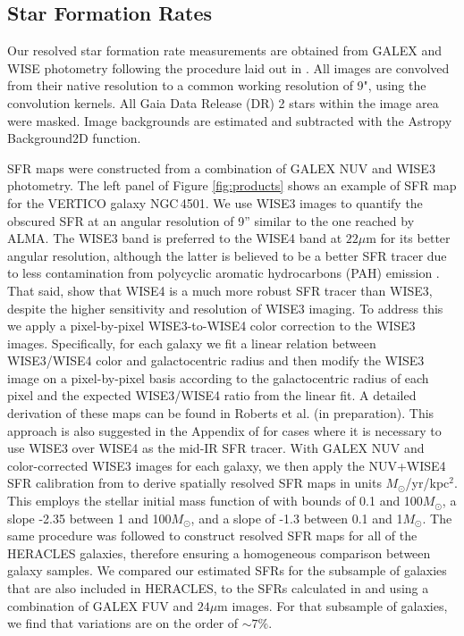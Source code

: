 \documentclass[longauth]{aa}
\begin{document}
\subsection{Star Formation Rates}
Our resolved star formation rate measurements are obtained from GALEX and WISE photometry following the procedure laid out in \citet{Leroy2019}. All images are convolved from their native resolution to a common working resolution of 9", using the \citet{Aniano2011} convolution kernels. All Gaia Data Release (DR) 2 stars within the image area were masked. Image backgrounds are estimated and subtracted with the Astropy Background2D function.

SFR maps were constructed from a combination of GALEX NUV and WISE3 photometry. The left panel of Figure \ref{fig:products} shows an example of SFR map for the VERTICO galaxy NGC\,4501. We use WISE3 images to quantify the obscured SFR at an angular resolution of 9'' similar to the one reached by ALMA. The WISE3 band is preferred to the 
WISE4 band at $22\mu$m for its better angular resolution, although the latter is believed to be a better SFR tracer due to less contamination from polycyclic aromatic hydrocarbons (PAH) emission \citep{Boselli2004}. That said, \citet{Leroy2019} show that WISE4 is a much more robust SFR tracer than WISE3, despite the higher sensitivity and resolution of WISE3 imaging. To address this we apply a pixel-by-pixel WISE3-to-WISE4 color correction to the WISE3 images. Specifically, for each galaxy we fit a linear relation between WISE3/WISE4 color and galactocentric radius and then modify the WISE3 image on a pixel-by-pixel basis according to the galactocentric radius of each pixel and the expected WISE3/WISE4 ratio from the linear fit. A detailed derivation of these maps can be found in Roberts et al. (in preparation). This approach is also suggested in the Appendix of \citet{Leroy2019} for cases where it is necessary to use WISE3 over WISE4 as the mid-IR SFR tracer. With GALEX NUV and color-corrected WISE3 images for each galaxy, we then apply the NUV+WISE4 SFR calibration from \citet{Leroy2019} to derive spatially resolved SFR maps in units $M_\odot$/yr/kpc$^2$. This employs the stellar initial mass function of \citet{Kroupa2003} with bounds of 0.1 and 100$M_\odot$, a slope -2.35
between 1 and 100$M_\odot$, and a slope of -1.3 between 0.1 and 1$M_\odot$. The same procedure was followed to construct resolved SFR maps for all of the HERACLES galaxies, therefore ensuring a homogeneous comparison between galaxy samples. We compared our estimated SFRs for the subsample of galaxies that are also included in HERACLES, to the SFRs calculated in \citet{Leroy2013} and \citet{Bigiel2008} using a combination of GALEX FUV and $24\mu$m images. For that subsample of galaxies, we find that variations are on the order of $\sim7\%$.
\end{document}
